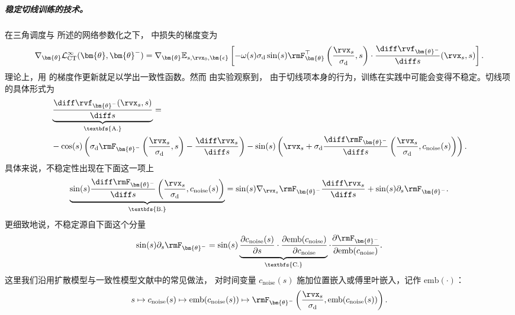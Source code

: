 \subparagraph{稳定切线训练的技术。}
在三角调度与  所述的网络参数化之下， 中损失的梯度变为
\begin{align}\label{eq:conti-ct-loss-trig}
    \nabla_{\bm{\theta}}\mathcal{L}^\infty_{\text{CT}}(\bm{\theta},\bm{\theta}^-)  =\nabla_{\bm{\theta}} \mathbb{E}_{s, \rvx_0, \bm{\epsilon}} \left[ -\omega(s) \sigma_{\mathrm{d}} \sin(s) \rmF_{\bm{\theta}}^\top\left( \frac{\rvx_s}{\sigma_{\mathrm{d}}}, s \right) \cdot \frac{\diff \rvf_{\bm{\theta}^-}}{\diff s} (\rvx_s, s) \right].
\end{align}
理论上，用  的梯度作更新就足以学出一致性函数。然而 \citet{lu2024simplifying} 由实验观察到，
由于切线项本身的行为，训练在实践中可能会变得不稳定。切线项的具体形式为
\begin{align*}
&\underbrace{\frac{\diff \rvf_{\bm{\theta}^-}(\rvx_s, s)}{\diff s}}_{\text{\textbfs{A.}}}
= \\&-\cos(s) \left( \sigma_{\mathrm{d}} \rmF_{\bm{\theta}^-}\left( \frac{\rvx_s}{\sigma_{\mathrm{d}}}, s \right) - \frac{\diff \rvx_s}{\diff s} \right) - \sin(s) \left( \rvx_s + \sigma_{\mathrm{d}} \frac{\diff \rmF_{\bm{\theta}^-}}{\diff s}\left( \frac{\rvx_s}{\sigma_{\mathrm{d}}}, c_{\mathrm{noise}}(s) \right) \right).
\end{align*}
具体来说，不稳定性出现在下面这一项上
\begin{align*}
\underbrace{\sin(s) \frac{\diff \rmF_{\bm{\theta}^-}}{\diff s}\left( \frac{\rvx_s}{\sigma_{\mathrm{d}}}, c_{\mathrm{noise}}(s) \right)}_{\text{\textbfs{B.}}}
= \sin(s) \nabla_{\rvx_s} \rmF_{\bm{\theta}^-} \frac{\diff \rvx_s}{\diff s}
+ \sin(s) \partial_s \rmF_{\bm{\theta}^-}.
\end{align*}
更细致地说，不稳定源自下面这个分量
\begin{align}\label{eq:ds-decomposition}
        \sin(s) \partial_s \rmF_{\bm{\theta}^-} = \sin(s) \underbrace{\frac{\partial c_{\mathrm{noise}}(s)}{\partial s} \cdot \frac{\partial \text{emb}(c_{\mathrm{noise}})}{\partial c_{\mathrm{noise}}}}_{\text{\textbfs{C.}}} \cdot \frac{\partial \rmF_{\bm{\theta}^-}}{\partial \text{emb}(c_{\mathrm{noise}})}.
\end{align}
这里我们沿用扩散模型与一致性模型文献中的常见做法，
对时间变量 $c_{\mathrm{noise}}(s)$ 施加位置嵌入或傅里叶嵌入，记作 $\text{emb}(\cdot)$：
\[
s \mapsto c_{\mathrm{noise}}(s) \mapsto \text{emb}(c_{\mathrm{noise}}(s)) \mapsto \rmF_{\bm{\theta}^-}\left( \frac{\rvx_s}{\sigma_{\mathrm{d}}}, \text{emb}(c_{\mathrm{noise}}(s)) \right).
\]


